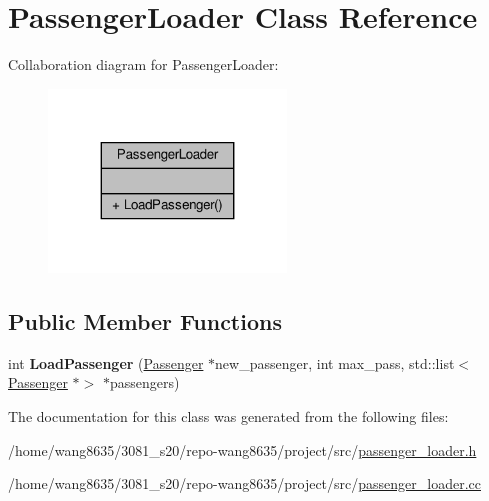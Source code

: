 \hypertarget{classPassengerLoader}{}\section{Passenger\+Loader Class Reference}
\label{classPassengerLoader}


Collaboration diagram for Passenger\+Loader\+:
\nopagebreak
\begin{figure}[H]
\begin{center}
\leavevmode
\includegraphics[width=179pt]{classPassengerLoader__coll__graph}
\end{center}
\end{figure}
\subsection*{Public Member Functions}
\begin{DoxyCompactItemize}
\item 
\mbox{\label{classPassengerLoader_a804ae6e894dd35dd6984dfd3b9b06b34}} 
int {\bfseries Load\+Passenger} (\hyperlink{classPassenger}{Passenger} $\ast$new\+\_\+passenger, int max\+\_\+pass, std\+::list$<$ \hyperlink{classPassenger}{Passenger} $\ast$$>$ $\ast$passengers)
\end{DoxyCompactItemize}


The documentation for this class was generated from the following files\+:\begin{DoxyCompactItemize}
\item 
/home/wang8635/3081\+\_\+s20/repo-\/wang8635/project/src/\hyperlink{passenger__loader_8h}{passenger\+\_\+loader.\+h}\item 
/home/wang8635/3081\+\_\+s20/repo-\/wang8635/project/src/\hyperlink{passenger__loader_8cc}{passenger\+\_\+loader.\+cc}\end{DoxyCompactItemize}

